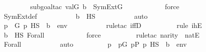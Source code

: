 \begin{isabellebody}
\ \ \ \ \ \ \ \ \isamarkupfalse%
{\isacharparenleft}{\kern0pt}subgoal{\isacharunderscore}{\kern0pt}tac\ {\isachardoublequoteopen}val{\isacharparenleft}{\kern0pt}G{\isacharcomma}{\kern0pt}\ b{\isacharparenright}{\kern0pt}\ {\isasymin}\ SymExt{\isacharparenleft}{\kern0pt}G{\isacharparenright}{\kern0pt}{\isachardoublequoteclose}{\isacharparenright}{\kern0pt}\ \isanewline
\ \ \ \ \ \ \ \ \ \isamarkupfalse%
\ force\ \isanewline
\ \ \ \ \ \ \ \ \isamarkupfalse%
\ SymExt{\isacharunderscore}{\kern0pt}def\ \isanewline
\ \ \ \ \ \ \ \ \isamarkupfalse%
\ {\isacartoucheopen}b\ {\isasymin}\ HS{\isacartoucheclose}\ \isanewline
\ \ \ \ \ \ \ \ \isamarkupfalse%
\ auto\isanewline
\ \ \ \ \ \ \isamarkupfalse%
\ \isamarkupfalse%
\ {\isachardoublequoteopen}{\isasymexists}p\ {\isasymin}\ G{\isachardot}{\kern0pt}\ p\ {\isasymtturnstile}HS\ {\isasymphi}\ {\isacharparenleft}{\kern0pt}{\isacharbrackleft}{\kern0pt}b{\isacharbrackright}{\kern0pt}\ {\isacharat}{\kern0pt}\ env{\isacharparenright}{\kern0pt}{\isachardoublequoteclose}\ \ \isanewline
\ \ \ \ \ \ \ \ \isamarkupfalse%
{\isacharparenleft}{\kern0pt}rule{\isacharunderscore}{\kern0pt}tac\ iffD{}{\isacharparenright}{\kern0pt}\isanewline
\ \ \ \ \ \ \ \ \ \isamarkupfalse%
{\isacharparenleft}{\kern0pt}rule\ ihE{\isacharparenright}{\kern0pt}\isanewline
\ \ \ \ \ \ \ \ \isamarkupfalse%
\ {\isacartoucheopen}b\ {\isasymin}\ HS{\isacartoucheclose}\ Forall\isanewline
\ \ \ \ \ \ \ \ \ \ \isamarkupfalse%
\ force\ \isanewline
\ \ \ \ \ \ \ \ \isamarkupfalse%
{\isacharparenleft}{\kern0pt}rule{\isacharunderscore}{\kern0pt}tac\ n{\isacharequal}{\kern0pt}{\isachardoublequoteopen}arity{\isacharparenleft}{\kern0pt}{\isasymphi}{\isacharparenright}{\kern0pt}{\isachardoublequoteclose}\ \ natE{\isacharparenright}{\kern0pt}\isanewline
\ \ \ \ \ \ \ \ \isamarkupfalse%
\ Forall\ \isanewline
\ \ \ \ \ \ \ \ \isamarkupfalse%
\ auto\isanewline
\ \ \ \ \ \ \isamarkupfalse%
\ \isamarkupfalse%
\ p\ \ {\isachardoublequoteopen}p{\isasymin}G{\isachardoublequoteclose}\ {\isachardoublequoteopen}p{\isasymin}P{\isachardoublequoteclose}\ {\isachardoublequoteopen}p\ {\isasymtturnstile}HS\ {\isasymphi}\ {\isacharparenleft}{\kern0pt}{\isacharbrackleft}{\kern0pt}b{\isacharbrackright}{\kern0pt}\ {\isacharat}{\kern0pt}\ env{\isacharparenright}{\kern0pt}{\isachardoublequoteclose}\ \isanewline

\end{isabellebody}
